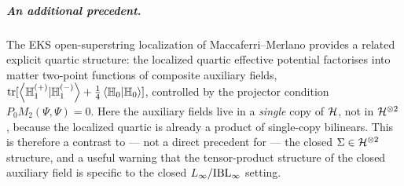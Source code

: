 \subparagraph{An additional precedent.} The EKS open-superstring localization of
Maccaferri--Merlano \cite{MaccaferriMerlano2019} provides a related explicit quartic structure:
the localized quartic effective potential factorises into matter two-point functions of
composite auxiliary fields, $\operatorname{tr}[\left \langle \mathbb{H}_1^{(+)}|\mathbb{H}_1^{(-)} \right \rangle
+\tfrac14\left \langle \mathbb{H}_0|\mathbb{H}_0 \right \rangle]$, controlled by the projector condition
$P_0M_2(\Psi,\Psi)=0$.
Here the auxiliary fields live in a \emph{single} copy of $\mathcal{H}$, not in $\mathcal{H}^{\otimes2}$,
because the localized quartic is already a product of single-copy bilinears. This is therefore a
contrast to --- not a direct precedent for --- the closed $\Sigma\in\mathcal{H}^{\otimes2}$ structure,
and a useful warning that the tensor-product structure of the closed auxiliary field is
specific to the closed $L_\infty/\mathrm{IBL}_\infty$ setting.

